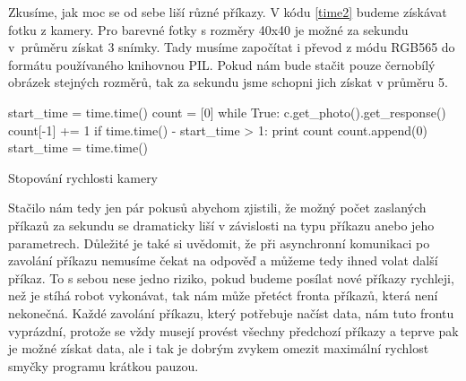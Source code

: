     Zkusíme, jak moc se od sebe liší různé příkazy. V kódu \ref{time2} budeme
    získávat fotku z kamery. Pro barevné fotky s rozměry 40x40 je možné za
    sekundu v~průměru získat 3 snímky. Tady musíme započítat i převod z módu
    RGB565 do formátu používaného knihovnou PIL. Pokud nám bude stačit pouze
    černobílý obrázek stejných rozměrů, tak za sekundu jsme schopni jich získat
    v průměru 5.

\begin{listing}
\begin{pyc}
start_time = time.time()
count = [0]
while True:
    c.get_photo().get_response()
    count[-1] += 1
    if time.time() - start_time > 1:
        print count
        count.append(0)
        start_time = time.time()
        \end{pyc}
\caption{Stopování rychlosti kamery}
\label{time2}
\end{listing}

    Stačilo nám tedy jen pár pokusů abychom zjistili, že možný počet zaslaných
    příkazů za sekundu se dramaticky liší v závislosti na typu příkazu anebo
    jeho parametrech. Důležité je také si uvědomit, že při asynchronní
    komunikaci po zavolání příkazu nemusíme čekat na odpověď a můžeme tedy
    ihned volat další příkaz. To s sebou nese jedno riziko, pokud budeme
    posílat nové příkazy rychleji, než je stíhá robot vykonávat, tak nám může
    přetéct fronta příkazů, která není nekonečná. Každé zavolání příkazu, který
    potřebuje načíst data, nám tuto frontu vyprázdní, protože se vždy musejí
    provést všechny předchozí příkazy a teprve pak je možné získat data, ale i
    tak je dobrým zvykem omezit maximální rychlost smyčky programu krátkou
    pauzou.
